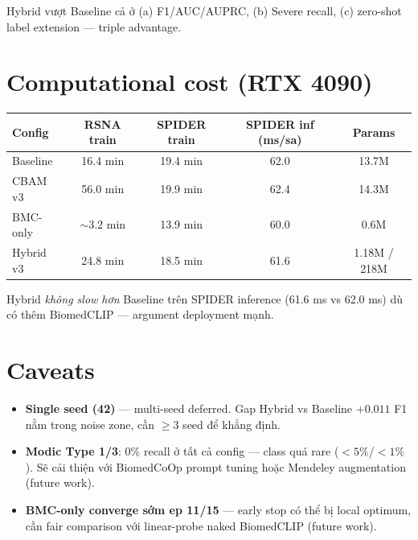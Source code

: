 \documentclass[11pt,a4paper]{article}
\begin{document}
\noindent Hybrid vượt Baseline cả ở (a) F1/AUC/AUPRC, (b) Severe
recall, (c) zero-shot label extension --- triple advantage.

\section{Computational cost (RTX 4090)}

\begin{table}[h]
\centering
\begin{tabular}{@{}lcccc@{}}
\toprule
\rowcolor{tablehdr}
Config & RSNA train & SPIDER train & SPIDER inf (ms/sa) & Params \\
\midrule
Baseline      & 16.4 min & 19.4 min & 62.0 & 13.7M \\
CBAM v3       & 56.0 min & 19.9 min & 62.4 & 14.3M \\
BMC-only      & ${\sim}3.2$ min & 13.9 min & 60.0 & 0.6M  \\
Hybrid v3     & 24.8 min & 18.5 min & 61.6 & 1.18M / 218M \\
\bottomrule
\end{tabular}
\end{table}

\noindent Hybrid \emph{không slow hơn} Baseline trên SPIDER inference
(61.6 ms vs 62.0 ms) dù có thêm BiomedCLIP --- argument deployment
mạnh.

\section{Caveats}

\begin{itemize}
\item \textbf{Single seed (42)} --- multi-seed deferred. Gap Hybrid vs
Baseline $+0.011$ F1 nằm trong noise zone, cần $\geq 3$ seed để
khẳng định.
\item \textbf{Modic Type 1/3}: 0\% recall ở tất cả config --- class
quá rare ($<5\%$/$<1\%$). Sẽ cải thiện với BiomedCoOp prompt tuning
hoặc Mendeley augmentation (future work).
\item \textbf{BMC-only converge sớm ep 11/15} --- early stop có thể bị
local optimum, cần fair comparison với linear-probe naked BiomedCLIP
(future work).
\end{itemize}
\end{document}
